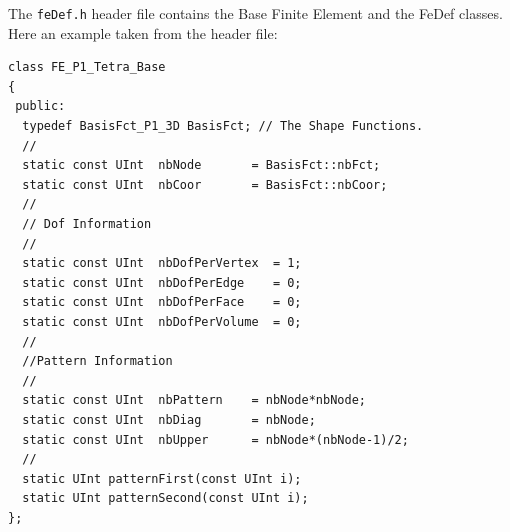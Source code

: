 The \texttt{feDef.h} header file contains the Base Finite Element and
the FeDef classes.  Here an example taken from the header file:
\begin{verbatim}
class FE_P1_Tetra_Base
{
 public:
  typedef BasisFct_P1_3D BasisFct; // The Shape Functions.
  //
  static const UInt  nbNode       = BasisFct::nbFct;
  static const UInt  nbCoor       = BasisFct::nbCoor;
  //
  // Dof Information
  //
  static const UInt  nbDofPerVertex  = 1;
  static const UInt  nbDofPerEdge    = 0;
  static const UInt  nbDofPerFace    = 0;
  static const UInt  nbDofPerVolume  = 0;
  // 
  //Pattern Information
  //
  static const UInt  nbPattern    = nbNode*nbNode;
  static const UInt  nbDiag       = nbNode;
  static const UInt  nbUpper      = nbNode*(nbNode-1)/2;
  //
  static UInt patternFirst(const UInt i);
  static UInt patternSecond(const UInt i);
};
\end{verbatim}
